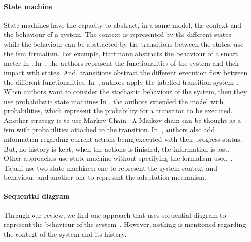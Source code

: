 \paragraph{State machine}
State machines have the capacity to abstract, in a same model, the context and the behaviour of a system.
The context is represented by the different states while the behaviour can be abstracted by the transitions between the states.
\cite{DBLP:conf/smartgridsec/0001FKNT14, DBLP:conf/icse/IftikharW14a, DBLP:conf/icse/ArcainiRS15, DBLP:conf/rv/ArcainiGR11, DBLP:conf/icse/GhezziPST13} use the \gls{fsm} formalism.
For example, Hartmann \etal abstracts the behaviour of a smart meter in \cite{DBLP:conf/smartgridsec/0001FKNT14}.
In~\cite{DBLP:conf/icse/GhezziPST13}, the authors represent the functionalities of the system and their impact with states.
And, transitions abstract the different execution flow between the different functionalities.
In~\cite{DBLP:conf/icse/BarbosaLMJ17, DBLP:journals/computing/BencomoBGBI13}, authors apply the labelled transition system~\cite{DBLP:journals/cacm/Keller76}.
When authors want to consider the stochastic \gls{behaviour} of the system, then they use probabilistic state machines
In \cite{DBLP:conf/icse/BarbosaLMJ17}, the authors extended  the model with probabilities, which represent the probability for a transition to be executed.
Another strategy is to use Markov Chain~\cite{DBLP:conf/sigsoft/MorenoCGS15, DBLP:conf/kbse/FilieriGLM11, DBLP:conf/dagstuhl/GhezziS10, DBLP:conf/icse/DuarteMS18}
A Markov chain can be thought as a \gls{fsm} with probabilities attached to the transition.
In~\cite{DBLP:conf/sigsoft/MorenoCGS15}, authors also add information regarding current \glspl{action} being executed with their progress status.
But, no history is kept, when the \glspl{action} is finished, the information is lost.
Other approaches use state machine without specifying the formalism used~\cite{DBLP:conf/wetice/DjoudiBZ14, DBLP:conf/aosd/ZhangGC09, DBLP:conf/kbse/TajalliGEM10}.
Tajalli \etal use two state machines: one to represent the system context and behaviour, and another one to represent the adaptation mechanism.

\paragraph{Sequential diagram}
Through our review, we find one approach that uses sequential diagram to represent the \gls{behaviour} of the system~\cite{DBLP:conf/icse/TaharaOH17}.
However, nothing is mentioned regarding the context of the system and its history.
	
